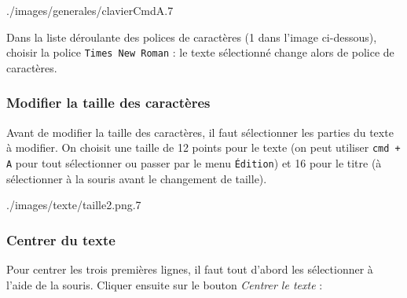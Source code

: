               {./images/generales/clavierCmdA}{.7\textwidth}

Dans la liste déroulante des polices de caractères (1 dans l'image ci-dessous), choisir la police \texttt{Times New Roman} : le texte sélectionné change alors de police de caractères.  




\subsubsection{Modifier la taille des caractères} 

Avant de modifier la taille des caractères, il faut sélectionner les parties du texte à modifier. On choisit une taille de 12 points pour le texte (on peut utiliser \texttt{cmd + A} pour tout sélectionner ou passer par le menu \texttt{Édition}) et 16 pour le titre (à sélectionner à la souris avant le changement de taille).

%
              {./images/texte/taille2.png}{.7\textwidth}







\subsubsection{Centrer du texte}

Pour centrer les trois premières lignes, il faut tout d'abord les sélectionner à l'aide de la souris. Cliquer ensuite sur le bouton \emph{Centrer le texte} : 


%
%
%




